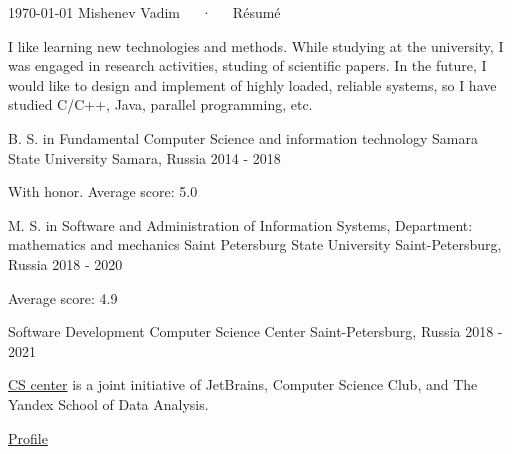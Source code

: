 \documentclass[11pt, a4paper]{awesome-cv}
\begin{document}
\makecvheader[C]

\makecvfooter
  {\today}
  {Mishenev Vadim~~~·~~~Résumé}
  {\thepage}



\begin{cvparagraph}

I like learning new technologies and methods. While studying at the university, I was engaged in research activities, studing of scientific papers.
In the future, I would like to design and implement of highly loaded, reliable systems, so I have studied C/C++, Java, parallel programming, etc.
\end{cvparagraph}






\begin{cventries}

\cventry
    {B. S. in Fundamental Computer Science and information technology} %
    {Samara State University} %
    {Samara, Russia} %
    {2014 - 2018} %
    {
      \begin{cvitems} %
        \item {With honor. Average score: 5.0}
      \end{cvitems}
    }
    \cventry
    {M. S. in Software and Administration of Information Systems, Department: mathematics and mechanics} %
    {Saint Petersburg State University} %
    {Saint-Petersburg, Russia} %
    {2018 - 2020} %
    {
      \begin{cvitems} %
        \item {Average score: 4.9}
      \end{cvitems}
    }
        \cventry
    {Software Development} %
    {Computer Science Center} %
    {Saint-Petersburg, Russia} %
    {2018 - 2021} %
    {
      \begin{cvitems} %
      \item \href{https://compscicenter.ru/}{CS center} is a joint initiative of JetBrains, Computer Science Club, and The
Yandex School of Data Analysis. 
        \item {\href{https://my.compscicenter.ru/users/4744/}{Profile}}
      \end{cvitems}
    }
    

\end{cventries}
\end{document}
